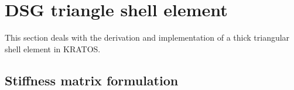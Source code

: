 





\setcounter{MaxMatrixCols}{20}




\chapter{DSG triangle shell element}
\label{chap:chapter_3}

\renewcommand{\Thema}{DSG triangle shell element}

This section deals with the derivation and implementation of a thick triangular shell element in KRATOS.

\section{Stiffness matrix formulation}

